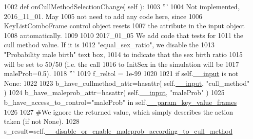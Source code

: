 \begin{DoxyCode}
1002     \textcolor{keyword}{def }\hyperlink{classnegui_1_1pgguisimupop__experimental_1_1PGGuiSimuPop_ac4d931e8f9892a3a9359829fb2f89335}{onCullMethodSelectionChange}( self ):
1003         \textcolor{stringliteral}{'''}
1004 \textcolor{stringliteral}{        Not implemented, 2016\_11\_01.  May}
1005 \textcolor{stringliteral}{        not need to add any code here, since}
1006 \textcolor{stringliteral}{        KeyListComboFrame control object resets}
1007 \textcolor{stringliteral}{        the attribute in the input object}
1008 \textcolor{stringliteral}{        automatically.}
1009 \textcolor{stringliteral}{}
1010 \textcolor{stringliteral}{        2017\_01\_05  We add code that tests for}
1011 \textcolor{stringliteral}{        the cull method value.  If it is }
1012 \textcolor{stringliteral}{        "equal\_sex\_ratio", we disable the}
1013 \textcolor{stringliteral}{        "Probability male birth" text box,}
1014 \textcolor{stringliteral}{        to indicate that the sex birth ratio}
1015 \textcolor{stringliteral}{        will be set to 50/50 (i.e. the call}
1016 \textcolor{stringliteral}{        to InitSex in the simulation will be}
1017 \textcolor{stringliteral}{        maleProb=0.5).}
1018 \textcolor{stringliteral}{        '''}
1019         f\_reltol = 1e-99    
1020 
1021         \textcolor{keywordflow}{if} self.\hyperlink{classnegui_1_1pgguisimupop__experimental_1_1PGGuiSimuPop_a3a86711306a221a40328ad4587999ad8}{\_\_input} \textcolor{keywordflow}{is} \textcolor{keywordflow}{not} \textcolor{keywordtype}{None}:
1022 
1023             b\_have\_cullmethod\_attr=hasattr( self.\hyperlink{classnegui_1_1pgguisimupop__experimental_1_1PGGuiSimuPop_a3a86711306a221a40328ad4587999ad8}{\_\_input}, \textcolor{stringliteral}{"cull\_method"} )
1024             b\_have\_maleprob\_attr=hasattr(  self.\hyperlink{classnegui_1_1pgguisimupop__experimental_1_1PGGuiSimuPop_a3a86711306a221a40328ad4587999ad8}{\_\_input}, \textcolor{stringliteral}{"maleProb"} )
1025             b\_have\_access\_to\_control=\textcolor{stringliteral}{"maleProb"} \textcolor{keywordflow}{in} self.\hyperlink{classnegui_1_1pgguisimupop__experimental_1_1PGGuiSimuPop_ad95dc47c19913b4eb1a4151af1e5879d}{\_\_param\_key\_value\_frames}
1026 
1027             \textcolor{comment}{#We ignore the returned value, which simply describes the action taken (if not None).}
1028             s\_result=self.\hyperlink{classnegui_1_1pgguisimupop__experimental_1_1PGGuiSimuPop_acbe690a5acc19473e1396f20ae39177b}{\_\_disable\_or\_enable\_maleprob\_according\_to\_cull\_method}

\end{DoxyCode}
